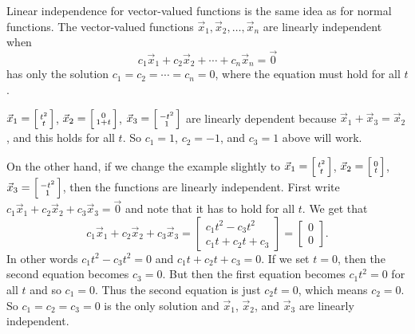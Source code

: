 Linear independence for vector-valued functions is the same idea as
for normal functions.
The vector-valued functions
$\vec{x}_1,\vec{x}_2,\ldots,\vec{x}_n$ are
linearly independent
when
\begin{equation*}
c_1 \vec{x}_1 + c_2 \vec{x}_2 + \cdots + c_n \vec{x}_n  = \vec{0}
\end{equation*}
has only the solution $c_1 = c_2 = \cdots = c_n = 0$, where the equation
must hold for all $t$.

\begin{example}
$\vec{x}_1 = \Bigl[ \begin{smallmatrix} t^2 \\ t \end{smallmatrix} \Bigr]$,
$\vec{x}_2 = \Bigl[ \begin{smallmatrix} 0 \\ 1+t \end{smallmatrix} \Bigr]$,
$\vec{x}_3 = \Bigl[ \begin{smallmatrix} -t^2 \\ 1 \end{smallmatrix} \Bigr]$
are linearly dependent because
$\vec{x}_1 + \vec{x}_3 = \vec{x}_2$, and this holds for all $t$.  So $c_1 =
1$, $c_2 = -1$, and $c_3 = 1$ above will work.

On the other hand, if we change the example slightly to
$\vec{x}_1 = \Bigl[ \begin{smallmatrix} t^2 \\ t \end{smallmatrix} \Bigr]$,
$\vec{x}_2 = \Bigl[ \begin{smallmatrix} 0 \\ t \end{smallmatrix} \Bigr]$,
$\vec{x}_3 = \Bigl[ \begin{smallmatrix} -t^2 \\ 1 \end{smallmatrix}
\Bigr]$,
then the functions are linearly independent.
First write
$c_1 \vec{x}_1 + c_2 \vec{x}_2 + c_3 \vec{x}_3  = \vec{0}$ and note that it
has to hold for all $t$.  We get that
\begin{equation*}
c_1 \vec{x}_1 + c_2 \vec{x}_2 + c_3 \vec{x}_3
=
\begin{bmatrix}
c_1 t^2 - c_3 t^2
\\
c_1 t + c_2 t + c_3 
\end{bmatrix}
=
\begin{bmatrix}
0
\\
0
\end{bmatrix} .
\end{equation*}
In other words
$c_1 t^2 - c_3 t^2 = 0$ and
$c_1 t + c_2 t + c_3 = 0$.
If we set $t = 0$, then the second equation becomes $c_3 = 0$.  But then
the first equation becomes
$c_1 t^2 = 0$ for all $t$ and so $c_1 = 0$.  Thus the second equation
is just $c_2 t = 0$, which means $c_2 = 0$.  So $c_1 = c_2 = c_3 = 0$
is the only solution and $\vec{x}_1$,
$\vec{x}_2$, and $\vec{x}_3$ are linearly independent.
\end{example}

